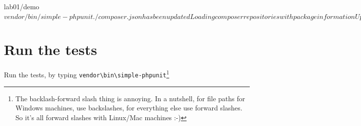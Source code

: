 \documentclass[a4paperpaper,openright]{book}
\newenvironment{Shaded}{}{}
\newcommand{\BuiltInTok}[1]{#1}
\newcommand{\ExtensionTok}[1]{#1}
\newcommand{\NormalTok}[1]{#1}
\begin{document}
\begin{Shaded}
\begin{Highlighting}[]
    \ExtensionTok{lab01/demo}\NormalTok{ $ vendor/bin/simple-phpunit}
       \ExtensionTok{./composer.json}\NormalTok{ has been updated}
       \ExtensionTok{Loading}\NormalTok{ composer repositories with package information}
       \ExtensionTok{Updating}\NormalTok{ dependencies}
       \ExtensionTok{Package}\NormalTok{ operations: 19 installs, 0 updates, 0 removals}
         \ExtensionTok{-}\NormalTok{ Installing sebastian/recursion-context (2.0.0)}\BuiltInTok{:}\NormalTok{ Loading from cache}
         \ExtensionTok{...}
         \ExtensionTok{-}\NormalTok{ Installing symfony/phpunit-bridge (5.7.99)}\BuiltInTok{:}\NormalTok{ Symlinking from /Users/matt/lab01/demo/vendor/symfony/phpunit-bridge}
       \ExtensionTok{Writing}\NormalTok{ lock file}
       \ExtensionTok{Generating}\NormalTok{ optimized autoload files}

    \ExtensionTok{lab01/demo}\NormalTok{ $}
\end{Highlighting}
\end{Shaded}

\hypertarget{run-the-tests}{%
\section{Run the tests}\label{run-the-tests}}

Run the tests, by typing
\texttt{vendor\textbackslash{}bin\textbackslash{}simple-phpunit}\footnote{The
  backlash-forward slash thing is annoying. In a nutshell, for file
  paths for Windows machines, use backslashes, for everything else use
  forward slashes. So it's all forward slashes with Linux/Mac machines
  :-)}

\begin{Shaded}
\end{Shaded}
\end{document}
